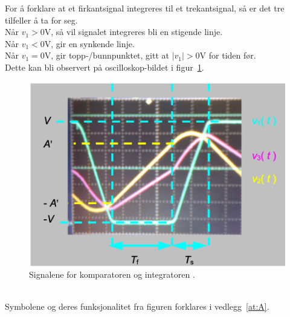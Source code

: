 \documentclass[a4paper,11pt,norsk]{article}
\begin{document}
For å forklare at et firkantsignal integreres til et trekantsignal, så er det tre tilfeller å ta for seg. \\
Når $v_1 > 0$V, så vil signalet integreres bli en stigende linje. \\
Når $v_1 < 0$V, gir en synkende linje. \\
Når $v_1 = 0$V, gir topp-/bunnpunktet, gitt at $|v_1| > 0$V for tiden før. \\
Dette kan bli observert på oscilloskop-bildet i figur~\ref{fig:bb_trekantsignal}.
\newpage
\begin{figure}[htbp]
    \centering
    \includegraphics[width=1.0\textwidth]{img/avbildning.png}
    \caption{Signalene for komparatoren og integratoren \cite{bb_trekantsignal}.}
    \label{fig:bb_trekantsignal}
\end{figure}
\\
Symbolene og deres funksjonalitet fra figuren forklares i vedlegg~\ref{at:A}.


\newpage
\end{document}
